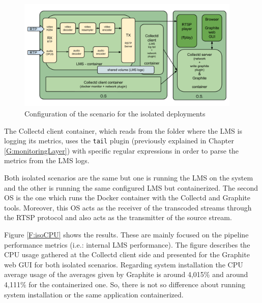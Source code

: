 \begin{figure}[!htb]
\begin{center}
\includegraphics[width=0.95\textwidth]{./images/isolatedScenario.png}
\caption{Configuration of the scenario for the isolated deployments}
\label{F:idsc}
\end{center}
\end{figure}

The Collectd client container, which reads from the folder where the LMS is logging its metrics, uses the \texttt{tail} plugin (previously explained in Chapter \ref{G:monitoringLayer}) with specific regular expressions in order to parse the metrics from the LMS logs.

Both isolated scenarios are the same but one is running the LMS on the system and the other is running the same configured LMS but containerized. The second OS is the one which runs the Docker container with the Collectd and Graphite tools. Moreover, this OS acts as the receiver of the transcoded streams through the RTSP protocol and also acts as the transmitter of the source stream.

Figure \ref{F:isoCPU} shows the results. These are mainly focused on the pipeline performance metrics (i.e.: internal LMS performance). The figure describes the CPU usage gathered at the Collectd client side and presented for the Graphite web GUI for both isolated scenarios. Regarding system installation the CPU average usage of the averages given by Graphite is around 4,015\% and around 4,111\% for the containerized one. So, there is not so difference about running system installation or the same application containerized.

